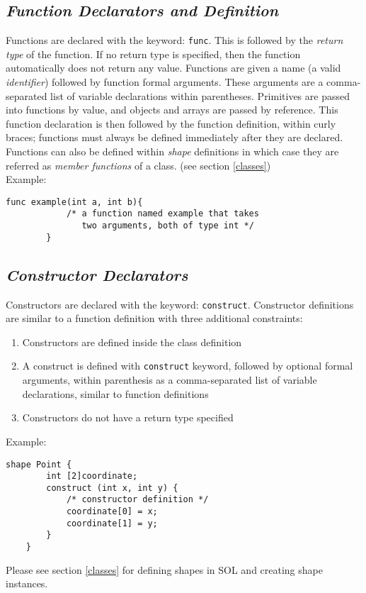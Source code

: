     \subsection{\textit{Function Declarators and Definition}} \label{function}
    Functions are declared with the keyword: \texttt{func}. This is followed by the \textit{return type} of the function. If no return type is specified, then the function automatically does not return any value. Functions are given a name (a valid \textit{identifier}) followed by function formal arguments. These arguments are a comma-separated list of variable declarations within parentheses. Primitives are passed into functions by value, and objects and arrays are passed by reference. This function declaration is then followed by the function definition, within curly braces; functions must always be defined immediately after they are declared.\\
    Functions can also be defined within \textit{shape} definitions in which case they are referred as \textit{member functions} of a class. (see section \ref{classes})\\

    Example:\\
    \begin{lstlisting}[style=sol]
        func example(int a, int b){
            /* a function named example that takes
               two arguments, both of type int */
        }
    \end{lstlisting}

    \subsection{\textit{Constructor Declarators}}
    Constructors are declared with the keyword: \texttt{construct}. Constructor definitions are similar to a function definition with three additional constraints: 
    \begin{enumerate}
        \itemsep0em
        \item Constructors are defined inside the class definition
        \item A construct is defined with \texttt{construct} keyword, followed by optional formal arguments, within parenthesis as a comma-separated list of variable declarations, similar to function definitions
        \item Constructors do not have a return type specified
    \end{enumerate}
    Example:\\
    \begin{lstlisting}[style=sol]
    shape Point {
        int [2]coordinate;
        construct (int x, int y) {
            /* constructor definition */
            coordinate[0] = x;
            coordinate[1] = y;
        }
    }
    \end{lstlisting}
    Please see section \ref{classes} for defining shapes in SOL and creating shape instances.

